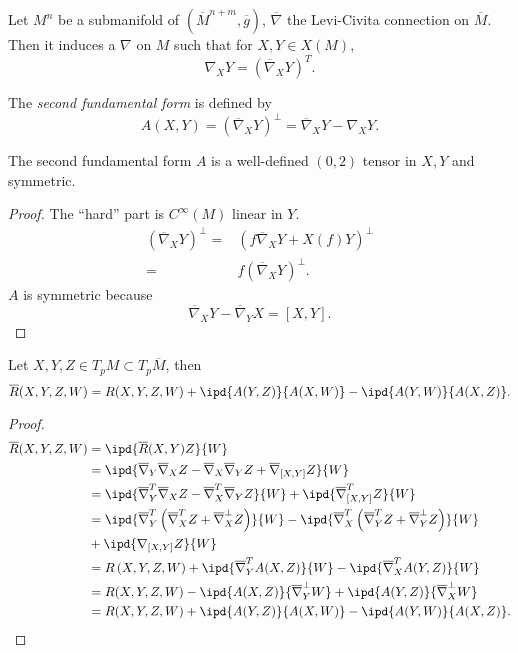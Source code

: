 Let $M^{n}$ be a submanifold of  $\left( \overline{M}^{n+m},\overline{g} \right) $, $\overline{\nabla }$ the Levi-Civita connection on $\overline{M}$. Then it induces a $\nabla $ on $M$ such that for $X,Y\in X(M)$, 
\[
  \nabla _XY=\left( \overline{\nabla }_XY \right) ^{T}.
\] 
\begin{definition}
  The \textit{second fundamental form} is defined by
  \begin{equation}
    A(X,Y)=\left( \overline{\nabla }_XY \right) ^{\perp}=\overline{\nabla }_XY-\nabla _XY.
  \end{equation}
\end{definition}

\begin{lemma}
  The second fundamental form  $A$ is a well-defined $(0,2)$ tensor in $X,Y$ and symmetric.
\end{lemma}
\begin{proof}
  The ``hard'' part is $C^\infty(M)$ linear in $Y$.
  \begin{align*}
    \left( \overline{\nabla }_XY \right) ^\perp = & \left( f \overline{\nabla }_XY+X(f)Y \right) ^{\perp}\\
    = & f\left( \overline{\nabla }_XY \right) ^{\perp}
  .\end{align*}
  $A$ is symmetric because
  \[
    \overline{\nabla }_XY-\overline{\nabla }_YX=[X,Y].
  \] 
\end{proof}
\begin{theorem}
  Let $X,Y,Z\in T_pM\subset T_p\overline{M}$, then 
  \begin{equation}
    \overline{R}(X,Y,Z,W)=R(X,Y,Z,W)+\ipd{A(Y,Z)}{A(X,W)}-\ipd{A(Y,W)}{A(X,Z)}.\label{gauss}
  \end{equation}
\end{theorem}
\begin{proof}
  \begin{align*}
    \overline{R}(X,Y,Z,W)&= \ipd{\overline{R}(X,Y)Z}{W}\\
    &= \ipd{\overline{\nabla }_Y \overline{\nabla }_X Z- \overline{\nabla }_X \overline{\nabla }_Y Z +\overline{\nabla }_{[X,Y]}Z}{W}\\
    &= \ipd{\overline{\nabla }_Y^{T} \overline{\nabla }_X Z- \overline{\nabla }_X^{T} \overline{\nabla }_Y Z}{W}+\ipd{\overline{\nabla }_{[X,Y]}^TZ}{W}\\
    &= \ipd{\overline{\nabla }_Y^T\left( \overline{\nabla }_X^T Z+ \overline{\nabla }_X^{\perp}Z \right) }{W}-\ipd{\overline{\nabla }_X^{T}\left( \overline{\nabla }_Y^TZ+ \overline{\nabla }_Y^\perp Z \right) }{W}\\
    &+\ipd{\nabla _{[X,Y]}Z}{W}\\
    &= R\left( X,Y,Z,W \right) +\ipd{\overline{\nabla }_Y^T A(X,Z)}{W}-\ipd{\overline{\nabla }_X^{T}A(Y,Z)}{W}\\
   &= R(X,Y,Z,W)-\ipd{A(X,Z)}{\overline{\nabla }_{Y}^{\perp}W}+\ipd{A(Y,Z)}{\overline{\nabla }_{X}^{\perp}W}\\
   &= R(X,Y,Z,W)+\ipd{A(Y,Z)}{A(X,W)}-\ipd{A(Y,W)}{A(X,Z)}
  .\end{align*}
\end{proof}
